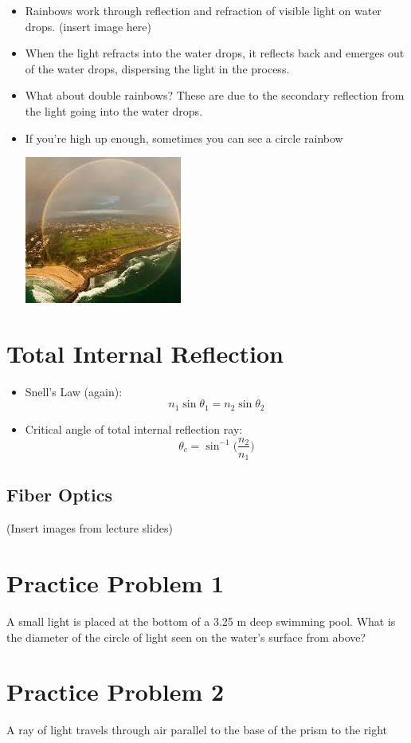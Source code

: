 \documentclass[12pt, letterpaper]{article}
\begin{document}
\begin{itemize}
    \item Rainbows work through reflection and refraction of visible light on water drops. (insert image here)
    \item When the light refracts into the water drops, it reflects back and emerges out of the water drops, dispersing the light in the process.
    \item What about double rainbows? These are due to the secondary reflection from the light going into the water drops.
    \item If you're high up enough, sometimes you can see a circle rainbow \begin{center}
        \includegraphics{images/circlerainbow.jpeg}
    \end{center}
\end{itemize}

\section*{Total Internal Reflection}

\begin{itemize}
    \item Snell's Law (again): \[n_{1}\sin{\theta_{1}} = n_{2}\sin{\theta_{2}}\]
    \item Critical angle of total internal reflection ray: \[\theta_{c} = \sin^{-1}{\Big(\frac{n_{2}}{n_{1}}\Big)}\]
\end{itemize}

\subsection*{Fiber Optics}

(Insert images from lecture slides)

\section*{Practice Problem 1}
A small light is placed at the bottom of a 3.25 m deep swimming pool. What is the diameter of the circle of light seen on the water's surface from above?

\section*{Practice Problem 2}
A ray of light travels through air parallel to the base of the prism to the right
\end{document}
